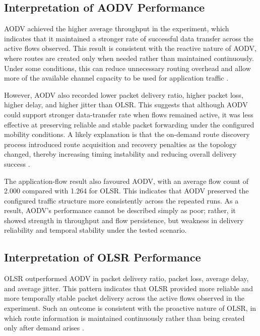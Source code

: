 \documentclass{Academic}
\begin{document}
\subsection{Interpretation of AODV Performance}

AODV achieved the higher average throughput in the experiment, which indicates that it maintained a stronger rate of successful data transfer across the active flows observed. This result is consistent with the reactive nature of AODV, where routes are created only when needed rather than maintained continuously. Under some conditions, this can reduce unnecessary routing overhead and allow more of the available channel capacity to be used for application traffic \parencite{perkins2003aodv,belding2003,midha2013}.

However, AODV also recorded lower packet delivery ratio, higher packet loss, higher delay, and higher jitter than OLSR. This suggests that although AODV could support stronger data-transfer rate when flows remained active, it was less effective at preserving reliable and stable packet forwarding under the configured mobility conditions. A likely explanation is that the on-demand route discovery process introduced route acquisition and recovery penalties as the topology changed, thereby increasing timing instability and reducing overall delivery success \parencite{chakeres2004,mohapatra2012,bappalige2020}.

The application-flow result also favoured AODV, with an average flow count of 2.000 compared with 1.264 for OLSR. This indicates that AODV preserved the configured traffic structure more consistently across the repeated runs. As a result, AODV’s performance cannot be described simply as poor; rather, it showed strength in throughput and flow persistence, but weakness in delivery reliability and temporal stability under the tested scenario.

\subsection{Interpretation of OLSR Performance}

OLSR outperformed AODV in packet delivery ratio, packet loss, average delay, and average jitter. This pattern indicates that OLSR provided more reliable and more temporally stable packet delivery across the active flows observed in the experiment. Such an outcome is consistent with the proactive nature of OLSR, in which route information is maintained continuously rather than being created only after demand arises \parencite{clausen2003olsr,clausen2011nhdp,clausen2014olsrv2}.
\end{document}
